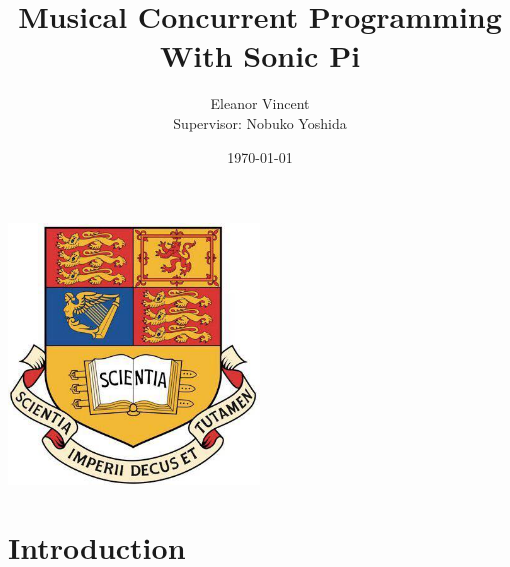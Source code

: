 \documentclass[11pt, abstracton, twoside, titlepage=true]{scrartcl}
\begin{document}
\subject{{\large Department of Computing \\ Imperial College London} \\
\LARGE{Individual MEng Project}}
\title{Musical Concurrent Programming \\ With Sonic Pi}
\author{{\LARGE Eleanor Vincent} \\ {\large Supervisor: Nobuko Yoshida}}
\date{\today} 

\maketitle{\thispagestyle{empty}}

\begin{center} 
	\includegraphics[width=0.50\textwidth]{images/crest.jpg}
\end{center}

\afterpage{\thispagestyle{empty}\null\newpage}
\newpage

\thispagestyle{empty}
\begin{abstract}
\noindent\lipsum[1]
\end{abstract}
\afterpage{\thispagestyle{empty}\null\newpage}
\newpage

\renewcommand{\abstractname}{Acknowledgements}

\thispagestyle{empty}
\begin{abstract}
\noindent\lipsum[1]
\end{abstract}
\afterpage{\thispagestyle{empty}\null\newpage}
\newpage

\thispagestyle{empty}
\tableofcontents
\newpage

\section{Introduction}
\thispagestyle{empty}
\end{document}
